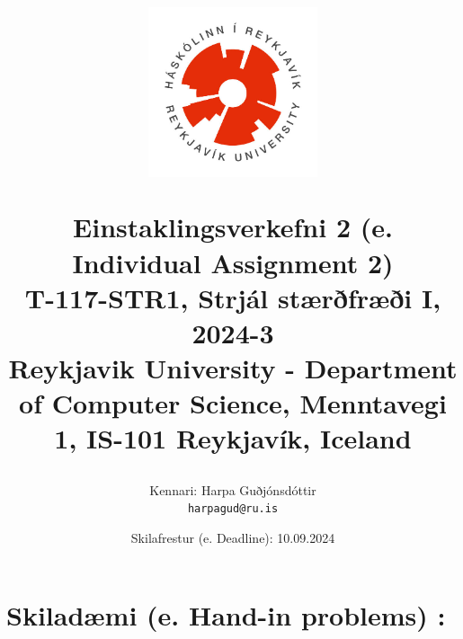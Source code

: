 \documentclass[12pt]{article}
\title{
\centerline{\includegraphics[width=50mm]{images/ru_logo.jpg}}
\vspace{0.5 cm}
Einstaklingsverkefni 2 (e. Individual Assignment 2)
\large  \\
T-117-STR1, Strjál stærðfræði I, 2024-3 \\ 
\small Reykjavik University - Department of Computer Science, Menntavegi 1, IS-101 Reykjavík, Iceland 
  }
\author{
    Kennari: Harpa Guðjónsdóttir\\
    \texttt{harpagud@ru.is}
}
\date{Skilafrestur (e. Deadline): 10.09.2024}
\begin{document}
\maketitle

\section*{\textbf{Skiladæmi (e. Hand-in problems) :}}





\end{document}
